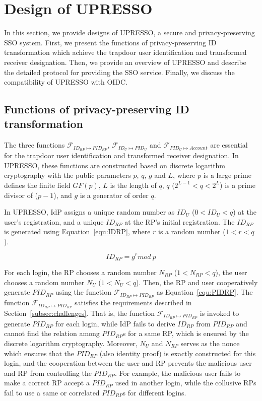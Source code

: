 \section{Design of UPRESSO}
\label{sec:UPRESSO}
In this section, we provide designs of UPRESSO, a secure and privacy-preserving SSO system.
First, we present the functions of privacy-preserving ID transformation which achieve the trapdoor user identification and transformed receiver designation. Then, we provide an overview of UPRESSO and describe the detailed protocol for providing the SSO service. Finally, we discuss the compatibility of UPRESSO with OIDC.

\subsection{Functions of privacy-preserving ID transformation}
\label{subsec:overview}
The three functions $\mathcal{F}_{ID_{RP} \mapsto PID_{RP}}$, $\mathcal{F}_{ID_{U} \mapsto PID_{U}}$ and $\mathcal{F}_{PID_{U} \mapsto Account}$  are essential for the trapdoor user identification and  transformed receiver designation.
In UPRESSO, these functions are constructed based on discrete logarithm cryptography with the public parameters $p$, $q$, $g$ and $L$,
 where  $p$ is a large prime defines the finite field $GF(p)$, $L$ is the length of $q$, $q$ ($2^{L-1} < q < 2^L$) is a prime divisor of ($p-1$), and $g$ is a generator of order $q$.

In UPRESSO, IdP assigns a  unique random number as  $ID_U$ ($0 < ID_U <q $)  at the user's registration, and a unique $ID_{RP}$ at the RP’s initial registration. The $ID_{RP}$ is generated using Equation~\ref{equ:IDRP}, where $r$ is a random number ($1 < r < q$).

\begin{equation}
    ID_{RP} = g^{r} mod \ p
   \label{equ:IDRP}
\end{equation}


For each login, the RP chooses a random number $N_{RP}$ ($1 < N_{RP}<q $), the user chooses a random number $N_{U}$ ($1 < N_{U}<q $). Then, the RP and user cooperatively  generate $PID_{RP}$ using the function $\mathcal{F}_{ID_{RP} \mapsto PID_{RP}}$ as Equation~\ref{equ:PIDRP}. The function $\mathcal{F}_{ID_{RP} \mapsto PID_{RP}}$ satisfies the requirements described in Section~\ref{subsec:challenges}. That is, the function $\mathcal{F}_{ID_{RP} \mapsto PID_{RP}}$ is invoked to generate $PID_{RP}$ for each login, while IdP  fails to derive $ID_{RP}$ from $PID_{RP}$ and cannot find the relation among ${PID_{RP}}$s for a same RP, which is ensured by the discrete logarithm cryptography.
Moreover, $N_{U}$ and $N_{RP}$  serves as the nonce which ensures that the $PID_{RP}$ (also identity proof) is exactly constructed for this login, and
the cooperation between the user and RP prevents the malicious user and RP from controlling the  $PID_{RP}$. For example, the malicious user fails to make a correct RP accept a $PID_{RP}$ used in another login, while the collusive RPs fail to use a same or correlated $PID_{RP}$s for different logins.


